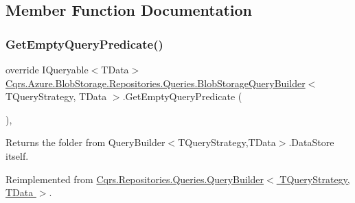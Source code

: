 \subsection{Member Function Documentation}
\mbox{\label{classCqrs_1_1Azure_1_1BlobStorage_1_1Repositories_1_1Queries_1_1BlobStorageQueryBuilder_a5987844de032c5473714dafcee7f4ae1_a5987844de032c5473714dafcee7f4ae1}} 
\subsubsection{\texorpdfstring{Get\+Empty\+Query\+Predicate()}{GetEmptyQueryPredicate()}}
{\footnotesize\ttfamily override I\+Queryable$<$T\+Data$>$ \hyperlink{classCqrs_1_1Azure_1_1BlobStorage_1_1Repositories_1_1Queries_1_1BlobStorageQueryBuilder}{Cqrs.\+Azure.\+Blob\+Storage.\+Repositories.\+Queries.\+Blob\+Storage\+Query\+Builder}$<$ T\+Query\+Strategy, T\+Data $>$.Get\+Empty\+Query\+Predicate (\begin{DoxyParamCaption}{ }\end{DoxyParamCaption})\hspace{0.3cm}{\ttfamily [protected]}, {\ttfamily [virtual]}}



Returns the folder from Query\+Builder$<$\+T\+Query\+Strategy,\+T\+Data$>$.\+Data\+Store itself. 



Reimplemented from \hyperlink{classCqrs_1_1Repositories_1_1Queries_1_1QueryBuilder_a7dc8f0da3bb4ef54b8cbdda6c50ee0a1_a7dc8f0da3bb4ef54b8cbdda6c50ee0a1}{Cqrs.\+Repositories.\+Queries.\+Query\+Builder$<$ T\+Query\+Strategy, T\+Data $>$}.


